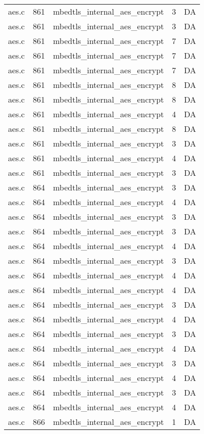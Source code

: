 \begin{table}
\begin{tabular}{lrlrr}
aes.c& 861&mbedtls\_internal\_aes\_encrypt&3 &DA\\
aes.c& 861&mbedtls\_internal\_aes\_encrypt&3 &DA\\
aes.c& 861&mbedtls\_internal\_aes\_encrypt&7 &DA\\
aes.c& 861&mbedtls\_internal\_aes\_encrypt&7 &DA\\
aes.c& 861&mbedtls\_internal\_aes\_encrypt&7 &DA\\
aes.c& 861&mbedtls\_internal\_aes\_encrypt&8 &DA\\
aes.c& 861&mbedtls\_internal\_aes\_encrypt&8 &DA\\
aes.c& 861&mbedtls\_internal\_aes\_encrypt&4 &DA\\
aes.c& 861&mbedtls\_internal\_aes\_encrypt&8 &DA\\
aes.c& 861&mbedtls\_internal\_aes\_encrypt&3 &DA\\
aes.c& 861&mbedtls\_internal\_aes\_encrypt&4 &DA\\
aes.c& 861&mbedtls\_internal\_aes\_encrypt&3 &DA\\
aes.c& 864&mbedtls\_internal\_aes\_encrypt&3 &DA\\
aes.c& 864&mbedtls\_internal\_aes\_encrypt&4 &DA\\
aes.c& 864&mbedtls\_internal\_aes\_encrypt&3 &DA\\
aes.c& 864&mbedtls\_internal\_aes\_encrypt&3 &DA\\
aes.c& 864&mbedtls\_internal\_aes\_encrypt&4 &DA\\
aes.c& 864&mbedtls\_internal\_aes\_encrypt&3 &DA\\
aes.c& 864&mbedtls\_internal\_aes\_encrypt&4 &DA\\
aes.c& 864&mbedtls\_internal\_aes\_encrypt&4 &DA\\
aes.c& 864&mbedtls\_internal\_aes\_encrypt&3 &DA\\
aes.c& 864&mbedtls\_internal\_aes\_encrypt&4 &DA\\
aes.c& 864&mbedtls\_internal\_aes\_encrypt&3 &DA\\
aes.c& 864&mbedtls\_internal\_aes\_encrypt&4 &DA\\
aes.c& 864&mbedtls\_internal\_aes\_encrypt&3 &DA\\
aes.c& 864&mbedtls\_internal\_aes\_encrypt&4 &DA\\
aes.c& 864&mbedtls\_internal\_aes\_encrypt&3 &DA\\
aes.c& 864&mbedtls\_internal\_aes\_encrypt&4 &DA\\
aes.c& 866&mbedtls\_internal\_aes\_encrypt&1 &DA\\

\end{tabular}
\end{table}
